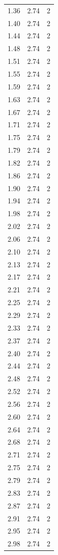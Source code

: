\begin{longtable}{lrr}
  1.36 & 2.74 & 2 \\
  1.40 & 2.74 & 2 \\
  1.44 & 2.74 & 2 \\
  1.48 & 2.74 & 2 \\
  1.51 & 2.74 & 2 \\
  1.55 & 2.74 & 2 \\
  1.59 & 2.74 & 2 \\
  1.63 & 2.74 & 2 \\
  1.67 & 2.74 & 2 \\
  1.71 & 2.74 & 2 \\
  1.75 & 2.74 & 2 \\
  1.79 & 2.74 & 2 \\
  1.82 & 2.74 & 2 \\
  1.86 & 2.74 & 2 \\
  1.90 & 2.74 & 2 \\
  1.94 & 2.74 & 2 \\
  1.98 & 2.74 & 2 \\
  2.02 & 2.74 & 2 \\
  2.06 & 2.74 & 2 \\
  2.10 & 2.74 & 2 \\
  2.13 & 2.74 & 2 \\
  2.17 & 2.74 & 2 \\
  2.21 & 2.74 & 2 \\
  2.25 & 2.74 & 2 \\
  2.29 & 2.74 & 2 \\
  2.33 & 2.74 & 2 \\
  2.37 & 2.74 & 2 \\
  2.40 & 2.74 & 2 \\
  2.44 & 2.74 & 2 \\
  2.48 & 2.74 & 2 \\
  2.52 & 2.74 & 2 \\
  2.56 & 2.74 & 2 \\
  2.60 & 2.74 & 2 \\
  2.64 & 2.74 & 2 \\
  2.68 & 2.74 & 2 \\
  2.71 & 2.74 & 2 \\
  2.75 & 2.74 & 2 \\
  2.79 & 2.74 & 2 \\
  2.83 & 2.74 & 2 \\
  2.87 & 2.74 & 2 \\
  2.91 & 2.74 & 2 \\
  2.95 & 2.74 & 2 \\
  2.98 & 2.74 & 2 \\

\end{longtable}
